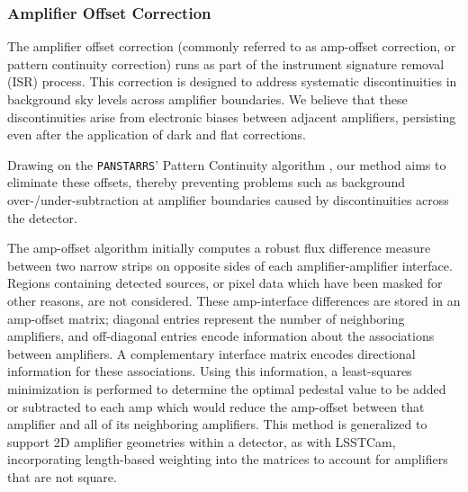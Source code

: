 \subsubsection{Amplifier Offset Correction}
\label{sec:isr:ampoffset}
The amplifier offset correction (commonly referred to as amp-offset correction, or pattern continuity correction) runs as part of the instrument signature removal (ISR) process.
This correction is designed to address systematic discontinuities in background sky levels across amplifier boundaries.
We believe that these discontinuities arise from electronic biases between adjacent amplifiers, persisting even after the application of dark and flat corrections.

Drawing on the \texttt{PANSTARRS}' Pattern Continuity algorithm \citep{2020ApJS..251....4W}, our method aims to eliminate these offsets, thereby preventing problems such as background over-/under-subtraction at amplifier boundaries caused by discontinuities across the detector.

The amp-offset algorithm initially computes a robust flux difference measure between two narrow strips on opposite sides of each amplifier-amplifier interface.
Regions containing detected sources, or pixel data which have been masked for other reasons, are not considered.
These amp-interface differences are stored in an amp-offset matrix; diagonal entries represent the number of neighboring amplifiers, and off-diagonal entries encode information about the associations between amplifiers.
A complementary interface matrix encodes directional information for these associations.
Using this information, a least-squares minimization is performed to determine the optimal pedestal value to be added or subtracted to each amp which would reduce the amp-offset between that amplifier and all of its neighboring amplifiers.
This method is generalized to support 2D amplifier geometries within a detector, as with LSSTCam, incorporating length-based weighting into the matrices to account for amplifiers that are not square.
